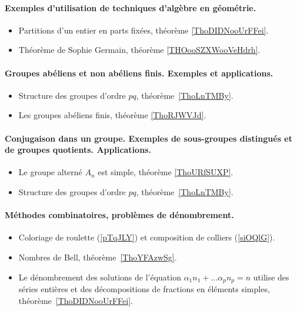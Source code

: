 \paragraph{Exemples d'utilisation de techniques d'algèbre en géométrie.}


\begin{itemize}
    \item Partitions d'un entier en parts fixées, théorème \ref{ThoDIDNooUrFFei}.
    \item Théorème de Sophie Germain, théorème \ref{THOooSZXWooVeHdrh}.
\end{itemize}
\paragraph{Groupes abéliens et non abéliens finis. Exemples et applications.}
\begin{itemize}
    \item Structure des groupes d'ordre \( pq\), théorème~\ref{ThoLnTMBy}.
    \item Les groupes abéliens finis, théorème \ref{ThoRJWVJd}.
\end{itemize}
\paragraph{Conjugaison dans un groupe. Exemples  de  sous-groupes  distingués  et de groupes quotients. Applications.}
\begin{itemize}
    \item Le groupe alterné \( A_n\) est simple, théorème \ref{ThoURfSUXP}.
    \item Structure des groupes d'ordre \( pq\), théorème~\ref{ThoLnTMBy}.
\end{itemize}
\paragraph{Méthodes combinatoires, problèmes de dénombrement.}
\begin{itemize}
    \item Coloriage de roulette (\ref{pTqJLY}) et composition de colliers (\ref{siOQlG}).
    \item Nombres de Bell, théorème~\ref{ThoYFAzwSg}.
    \item Le dénombrement des solutions de l'équation \( \alpha_1 n_1+\ldots \alpha_pn_p=n\) utilise des séries entières et des décompositions de fractions en éléments simples, théorème~\ref{ThoDIDNooUrFFei}.
\end{itemize}
